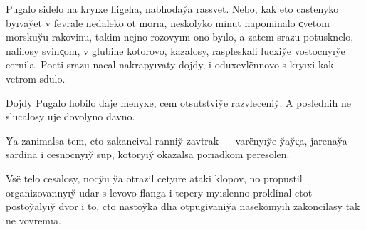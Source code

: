 \documentclass[10pt]{book}
\begin{document}
\newcommand{\e}{ë}

\newcommand{\yi}{yı}

\newcommand{\ia}{ıa}

\newcommand{\iu}{ıo}

\newcommand{\y}{y̆}
\newcommand{\yf}{y̆}

\newcommand{\Y}{Y̆}

\newcommand{\X}{X̹}
\newcommand{\x}{x̹}
\newcommand{\C}{C̹}
\renewcommand{\c}{c̹}

%
% 
%
% 
% 
% 
Pugalo sidelo na kr{\yi}xe fligel{\ia}, nabl{\iu}da{\y}a rassvet. Nebo, kak eto castenyko b{\yi}va{\y}et v fevrale nedaleko ot mor{\ia}, neskolyko minut napominalo {\c}vetom morsku{\y}u rakovinu, takim nejno-rozov{\yi}m ono b{\yi}lo, a zatem srazu potusknelo, nalilosy svin{\c}om, v glubine kotorovo, kazalosy, raspleskali lucxi{\y}e vostocn{\yi}{\y}e cernila. Pocti srazu nacal nakrap{\yi}vaty dojdy, i oduxevl{\e}nnovo s kr{\yi}xi kak vetrom sdulo.

Dojdy Pugalo l{\iu}bilo daje menyxe, cem otsutstvi{\y}e razvleceni{\y}. A poslednih ne slucalosy uje dovolyno davno.

{\Y}a zanimalsa tem, cto zakancival ranni{\y} zavtrak — var{\e}n{\yi}{\y}e {\y}a{\y}{\c}a, jarena{\y}a sardina i cesnocn{\yi}{\y} sup, kotor{\yi}{\y} okazalsa por{\ia}dkom peresolen.

Vs{\e} telo cesalosy, noc{\y}u {\y}a otrazil cet{\yi}re ataki klopov, no propustil organizovann{\yi}{\y} udar s levovo flanga i tepery m{\yi}slenno proklinal etot posto{\y}al{\yi}{\y} dvor i to, cto nasto{\y}ka dl{\ia} otpugivani{\y}a nasekom{\yi}h zakoncilasy tak ne vovrem{\ia}.
\end{document}

